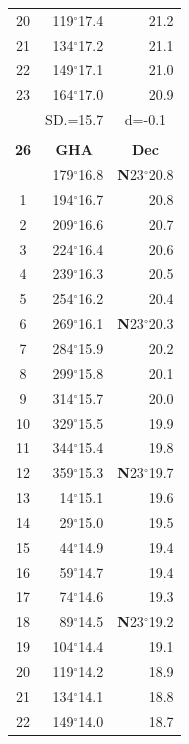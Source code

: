 \documentclass[10pt, a4paper]{report}
\begin{document}
\begin{scriptsize}
\begin{tabular*}{0.2\textwidth}[t]{@{\extracolsep{\fill}}|c|rr|}
20 & 119$^\circ$17.4 & 21.2\\
21 & 134$^\circ$17.2 & \raisebox{0.24ex}{\boldmath$\cdot$~\boldmath$\cdot$~~}21.1\\
22 & 149$^\circ$17.1 & 21.0\\
23 & 164$^\circ$17.0 & 20.9\\
\hline
\rule{0pt}{2.4ex} & \multicolumn{1}{c}{SD.=15.7} & \multicolumn{1}{c|}{d=-0.1}\\
\hline
\multicolumn{1}{c}{}\\[-0.5ex]\hline
\multicolumn{1}{|c|}{\rule{0pt}{2.6ex}\textbf{26}} & \multicolumn{1}{c}{\textbf{GHA}} & \multicolumn{1}{c|}{\textbf{Dec}}\\
\hline\rule{0pt}{2.6ex}\noindent
0 & 179$^\circ$16.8 & \textbf{N}23$^\circ$20.8\\
1 & 194$^\circ$16.7 & 20.8\\
2 & 209$^\circ$16.6 & 20.7\\
3 & 224$^\circ$16.4 & \raisebox{0.24ex}{\boldmath$\cdot$~\boldmath$\cdot$~~}20.6\\
4 & 239$^\circ$16.3 & 20.5\\
5 & 254$^\circ$16.2 & 20.4\\[2Pt]
6 & 269$^\circ$16.1 & \textbf{N}23$^\circ$20.3\\
7 & 284$^\circ$15.9 & 20.2\\
8 & 299$^\circ$15.8 & 20.1\\
9 & 314$^\circ$15.7 & \raisebox{0.24ex}{\boldmath$\cdot$~\boldmath$\cdot$~~}20.0\\
10 & 329$^\circ$15.5 & 19.9\\
11 & 344$^\circ$15.4 & 19.8\\[2Pt]
12 & 359$^\circ$15.3 & \textbf{N}23$^\circ$19.7\\
13 & 14$^\circ$15.1 & 19.6\\
14 & 29$^\circ$15.0 & 19.5\\
15 & 44$^\circ$14.9 & \raisebox{0.24ex}{\boldmath$\cdot$~\boldmath$\cdot$~~}19.4\\
16 & 59$^\circ$14.7 & 19.4\\
17 & 74$^\circ$14.6 & 19.3\\[2Pt]
18 & 89$^\circ$14.5 & \textbf{N}23$^\circ$19.2\\
19 & 104$^\circ$14.4 & 19.1\\
20 & 119$^\circ$14.2 & 18.9\\
21 & 134$^\circ$14.1 & \raisebox{0.24ex}{\boldmath$\cdot$~\boldmath$\cdot$~~}18.8\\
22 & 149$^\circ$14.0 & 18.7\\

\end{tabular*}
\end{scriptsize}
\end{document}
